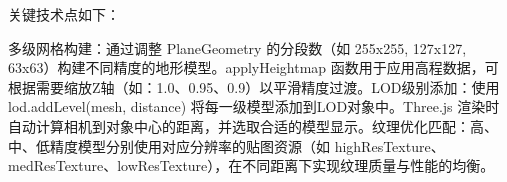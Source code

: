 \begin{Shaded}
\begin{Highlighting}[]
\OperatorTok{,}

\NormalTok{(\{ }\OperatorTok{:}

\NormalTok{)}\OperatorTok{;}

\OperatorTok{,} \NormalTok{)}\OperatorTok{;}


\OperatorTok{=} \NormalTok{(}\OperatorTok{,} \OperatorTok{,} \OperatorTok{,} \NormalTok{)}\OperatorTok{;}

\OperatorTok{,}\OperatorTok{,} \NormalTok{)}\OperatorTok{;}

\OperatorTok{=} \NormalTok{(}

\OperatorTok{,}

\NormalTok{(\{ }\OperatorTok{:}

\NormalTok{)}\OperatorTok{;}

\OperatorTok{,} \NormalTok{)}\OperatorTok{;}

\OperatorTok{;}

\NormalTok{\}}
\end{Highlighting}
\end{Shaded}

关键技术点如下：

多级网格构建：通过调整 PlaneGeometry 的分段数（如 255x255, 127x127, 63x63）构建不同精度的地形模型。applyHeightmap 函数用于应用高程数据，可根据需要缩放Z轴（如：1.0、0.95、0.9）以平滑精度过渡。LOD级别添加：使用 lod.addLevel(mesh, distance) 将每一级模型添加到LOD对象中。Three.js 渲染时自动计算相机到对象中心的距离，并选取合适的模型显示。纹理优化匹配：高、中、低精度模型分别使用对应分辨率的贴图资源（如 highResTexture、medResTexture、lowResTexture），在不同距离下实现纹理质量与性能的均衡。

